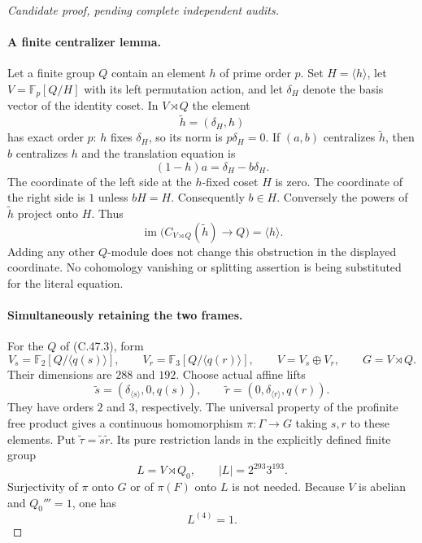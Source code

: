 \begin{proof}[Candidate proof, pending complete independent audits]
\paragraph{A finite centralizer lemma.}
Let a finite group $Q$ contain an element $h$ of prime order $p$.
Set $H=\langle h\rangle$, let $V=\mathbb F_p[Q/H]$ with its
left permutation action, and let $\delta_H$ denote the basis vector
of the identity coset. In $V\rtimes Q$ the element
\[
                       \widetilde h=(\delta_H,h)
\]
has exact order $p$: $h$ fixes $\delta_H$, so its norm is
$p\delta_H=0$. If $(a,b)$ centralizes $\widetilde h$, then
$b$ centralizes $h$ and the translation equation is
\[
                    (1-h)a=\delta_H-b\delta_H.       \tag{C.47.5}
\]
The coordinate of the left side at the $h$-fixed coset $H$ is zero.
The coordinate of the right side is $1$ unless $bH=H$.
Consequently $b\in H$. Conversely the powers of
$\widetilde h$ project onto $H$. Thus
\[
       \operatorname{im}\bigl(C_{V\rtimes Q}(\widetilde h)\to Q\bigr)
                      =\langle h\rangle.            \tag{C.47.6}
\]
Adding any other $Q$-module does not change this obstruction in
the displayed coordinate. No cohomology vanishing or splitting
assertion is being substituted for the literal equation.

\paragraph{Simultaneously retaining the two frames.}
For the $Q$ of (C.47.3), form
\[
 V_s=\mathbb F_2[Q/\langle q(s)\rangle],\qquad
 V_r=\mathbb F_3[Q/\langle q(r)\rangle],\qquad
 V=V_s\oplus V_r,\qquad G=V\rtimes Q.
\]
Their dimensions are $288$ and $192$. Choose actual affine lifts
\[
 \widetilde s=(\delta_{\langle s\rangle},0,q(s)),\qquad
 \widetilde r=(0,\delta_{\langle r\rangle},q(r)).     \tag{C.47.7}
\]
They have orders $2$ and $3$, respectively. The universal property
of the profinite free product gives a continuous homomorphism
$\pi:\Gamma\to G$ taking $s,r$ to these elements. Put
$\widetilde\tau=\widetilde s\widetilde r$.
Its pure restriction lands in the explicitly defined finite group
\[
                   L=V\rtimes Q_0,
             \qquad |L|=2^{293}3^{193}.              \tag{C.47.8}
\]
Surjectivity of $\pi$ onto $G$ or of $\pi(F)$ onto $L$ is not
needed. Because $V$ is abelian and $Q_0'''=1$, one has
\[
                              L^{(4)}=1.             \tag{C.47.9}
\]


\end{proof}
